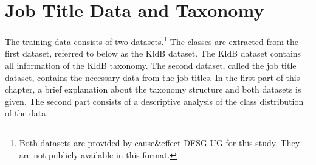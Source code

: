 \documentclass[12pt, a4paper, titlepage]{article}
\begin{document}
\begin{table}[]
  \caption[Overview of Classes Level 1 - Berufsbereiche]{\label{tab: T3} Overview of Classes Level 1 - Berufsbereiche (adapted from \citep[9]{Bundesagentur2011a} and \citep[1]{Bundesagentur2011b})}
  \end{table}


\section{Job Title Data and Taxonomy}
\setcounter{footnote}{0}
The training data consists of two datasets.\footnote{Both datasets are provided by cause\&effect DFSG UG for this study. They are not publicly available in this format.} The classes are extracted from the first dataset, referred to below as the \ac{KldB} dataset. The \ac{KldB} dataset contains all information of the \ac{KldB} taxonomy. The second dataset, called the job title dataset, contains the necessary data from the job titles. In the first part of this chapter, a brief explanation about the taxonomy structure and both datasets is given. The second part consists of a descriptive analysis of the class distribution of the data. 
\end{document}
